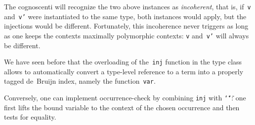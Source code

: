 \documentclass[9pt,preprint,authoryear]{sigplanconf}
\begin{document}
%
The cognoscenti will recognize the two above instances as
    \emph{incoherent}, that is, if{~}\textcolor[rgb]{0,0,0.80}{\texttt{v}} and{~}\textcolor[rgb]{0,0,0.80}{\texttt{v{'}}} were instantiated
    to the same type, both instances would apply, but the injections would be different. Fortunately,
    this incoherence never triggers as long as one keeps the contexts
    maximally polymorphic contexts{:} \textcolor[rgb]{0,0,0.80}{\texttt{v}} and{~}\textcolor[rgb]{0,0,0.80}{\texttt{v{'}}} will always be
    different.%


%
We have seen before that the overloading of the{~}\textcolor[rgb]{0,0,0.80}{\texttt{inj}} function
    in the type class{~}\textcolor[rgb]{0,0,0.80}{\texttt{\makebox[1.22ex][c]{$ \in $}}} allows to automatically convert a type-level
    reference to a term into a properly tagged de{~}Bruijn index, namely
    the function{~}\textcolor[rgb]{0,0,0.80}{\texttt{var}}.%


%
Conversely, one can implement occurrence-check by combining  \textcolor[rgb]{0,0,0.80}{\texttt{inj}} with \textcolor[cmyk]{0,0.65,0.99,0}{\texttt{\makebox[1.22ex][l]{$ {(} $}}}\textcolor[rgb]{0,0,0.80}{\texttt{{\char `\=}{\char `\=}}}\textcolor[cmyk]{0,0.65,0.99,0}{\texttt{\makebox[1.22ex][r]{$ {)} $}}}{:}
    one first lifts the bound variable to the context of the chosen occurrence and
    then tests for equality.%


{\nopagebreak }
\end{document}
